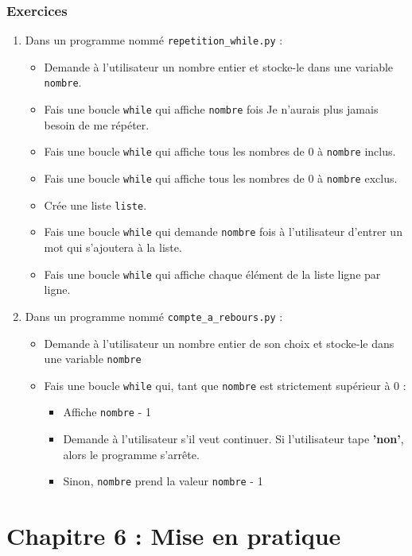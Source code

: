 \documentclass[11pt]{article}
\begin{document}
\subsubsection*{Exercices}
\label{sec:org222cbaa}
\begin{enumerate}
\item Dans un programme nommé \texttt{repetition\_while.py} :
\begin{itemize}
\item Demande à l'utilisateur un nombre entier et stocke-le dans une variable \texttt{nombre}.
\item Fais une boucle \texttt{while} qui affiche \texttt{nombre} fois \og Je n'aurais plus jamais besoin de me répéter\fg{}.
\item Fais une boucle \texttt{while} qui affiche tous les nombres de 0 à \texttt{nombre} inclus.
\item Fais une boucle \texttt{while} qui affiche tous les nombres de 0 à \texttt{nombre} exclus.
\item Crée une liste \texttt{liste}.
\item Fais une boucle \texttt{while} qui demande \texttt{nombre} fois à l'utilisateur d'entrer un mot qui s'ajoutera à la liste.
\item Fais une boucle \texttt{while} qui affiche chaque élément de la liste ligne par ligne.
\end{itemize}

\item Dans un programme nommé \texttt{compte\_a\_rebours.py} :
\begin{itemize}
\item Demande à l'utilisateur un nombre entier de son choix et stocke-le dans une variable \texttt{nombre}
\item Fais une boucle \texttt{while} qui, tant que \texttt{nombre} est strictement supérieur à 0 :
\begin{itemize}
\item Affiche \texttt{nombre} - 1
\item Demande à l'utilisateur s'il veut continuer. Si l'utilisateur tape \textbf{'non'}, alors le programme s'arrête.
\item Sinon, \texttt{nombre} prend la valeur \texttt{nombre} - 1
\end{itemize}
\end{itemize}
\end{enumerate}

\section*{Chapitre 6 : Mise en pratique}
\label{chapitre6}
\end{document}
